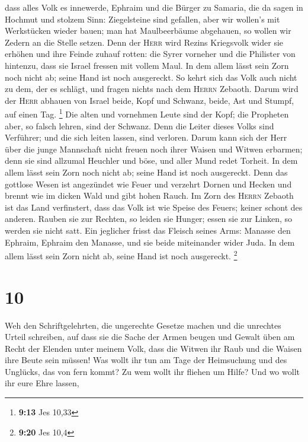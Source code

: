  dass alles Volk es innewerde, Ephraim und die Bürger zu
Samaria, die da sagen in Hochmut und stolzem Sinn: 
Ziegelsteine sind gefallen, aber wir wollen's mit Werkstücken wieder
bauen; man hat Maulbeerbäume abgehauen, so wollen wir Zedern an die
Stelle setzen.  Denn der \textsc{Herr} wird Rezins
Kriegsvolk wider sie erhöhen und ihre Feinde zuhauf rotten:
 die Syrer vorneher und die Philister von hintenzu, dass
sie Israel fressen mit vollem Maul. In dem allem lässt sein Zorn noch
nicht ab; seine Hand ist noch ausgereckt.  So kehrt sich
das Volk auch nicht zu dem, der es schlägt, und fragen nichts nach dem
\textsc{Herrn} Zebaoth.  Darum wird der \textsc{Herr}
abhauen von Israel beide, Kopf und Schwanz, beide, Ast und Stumpf, auf
einen Tag. \footnote{\textbf{9:13} Jes 10,33}  Die alten
und vornehmen Leute sind der Kopf; die Propheten aber, so falsch lehren,
sind der Schwanz.  Denn die Leiter dieses Volks sind
Verführer; und die sich leiten lassen, sind verloren. 
Darum kann sich der Herr über die junge Mannschaft nicht freuen noch
ihrer Waisen und Witwen erbarmen; denn sie sind allzumal Heuchler und
böse, und aller Mund redet Torheit. In dem allem lässt sein Zorn noch
nicht ab; seine Hand ist noch ausgereckt.  Denn das
gottlose Wesen ist angezündet wie Feuer und verzehrt Dornen und Hecken
und brennt wie im dicken Wald und gibt hohen Rauch.  Im
Zorn des \textsc{Herrn} Zebaoth ist das Land verfinstert, dass das Volk
ist wie Speise des Feuers; keiner schont des anderen. 
Rauben sie zur Rechten, so leiden sie Hunger; essen sie zur Linken, so
werden sie nicht satt. Ein jeglicher frisst das Fleisch seines Arms:
 Manasse den Ephraim, Ephraim den Manasse, und sie beide
miteinander wider Juda. In dem allem lässt sein Zorn nicht ab, seine
Hand ist noch ausgereckt. \footnote{\textbf{9:20} Jes 10,4}

\hypertarget{section-5}{%
\section{10}\label{section-5}}

 Weh den Schriftgelehrten, die ungerechte Gesetze machen
und die unrechtes Urteil schreiben,  auf dass sie die
Sache der Armen beugen und Gewalt üben am Recht der Elenden unter meinem
Volk, dass die Witwen ihr Raub und die Waisen ihre Beute sein müssen!
 Was wollt ihr tun am Tage der Heimsuchung und des
Unglücks, das von fern kommt? Zu wem wollt ihr fliehen um Hilfe? Und wo
wollt ihr eure Ehre lassen,

